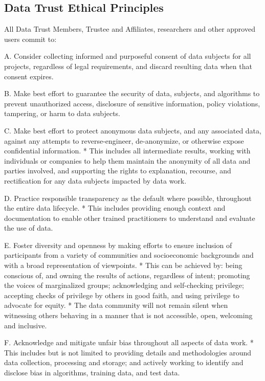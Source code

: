 \documentclass[]{book}
\begin{document}
\hypertarget{data-trust-ethical-principles-1}{%
\subsection*{Data Trust Ethical Principles}\label{data-trust-ethical-principles-1}}

All Data Trust Members, Trustee and Affiliates, researchers and other approved users commit to:

A. Consider collecting informed and purposeful consent of data subjects for all projects, regardless of legal requirements, and discard resulting data when that consent expires.

B. Make best effort to guarantee the security of data, subjects, and algorithms to prevent unauthorized access, disclosure of sensitive information, policy violations, tampering, or harm to data subjects.

C. Make best effort to protect anonymous data subjects, and any associated data, against any attempts to reverse-engineer, de-anonymize, or otherwise expose confidential information.
* This includes all intermediate results, working with individuals or companies to help them maintain the anonymity of all data and parties involved, and supporting the rights to explanation, recourse, and rectification for any data subjects impacted by data work.

D. Practice responsible transparency as the default where possible, throughout the entire data lifecycle.
* This includes providing enough context and documentation to enable other trained practitioners to understand and evaluate the use of data.

E. Foster diversity and openness by making efforts to ensure inclusion of participants from a variety of communities and socioeconomic backgrounds and with a broad representation of viewpoints.
* This can be achieved by: being conscious of, and owning the results of actions, regardless of intent; promoting the voices of marginalized groups; acknowledging and self-checking privilege; accepting checks of privilege by others in good faith, and using privilege to advocate for equity.
* The data community will not remain silent when witnessing others behaving in a manner that is not accessible, open, welcoming and inclusive.

F. Acknowledge and mitigate unfair bias throughout all aspects of data work.
* This includes but is not limited to providing details and methodologies around data collection, processing and storage; and actively working to identify and disclose bias in algorithms, training data, and test data.
\end{document}

